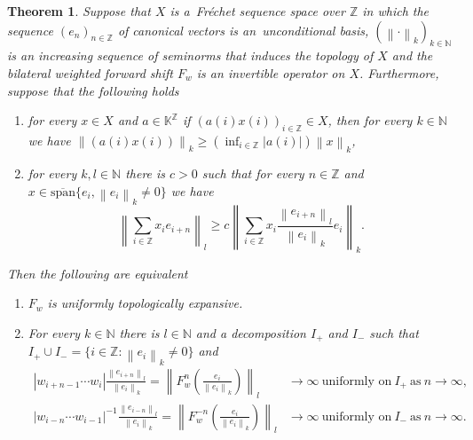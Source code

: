 \documentclass[11pt,a4paper]{amsart}
\newtheorem{theorem}{Theorem}[section]
\theoremstyle{definition}
\newcommand{\Z}{\mathbb{Z}}
\newcommand{\N}{\mathbb{N}}
\newcommand{\K}{\mathbb{K}}
\newcommand{\abs}[1]{\left| #1 \right|}
\newcommand{\norm}[1]{\left\| #1 \right\|}
\newcommand{\linsp}{\mathrm{span}}
\newcommand{\cllinsp}{\overline{\linsp}}
\begin{document}
	\begin{theorem}
		\label{thm:UTEcharacterisation}
		Suppose that \(X\) is a~Fréchet sequence space over \(\Z\) in which the sequence \((e_n)_{n \in \Z}\) of canonical vectors is an~unconditional basis, \((\norm{\cdot}_k)_{k \in \N}\) is an increasing sequence of seminorms that induces the topology of \(X\) and the bilateral weighted forward shift \(F_w\) is an invertible operator on \(X\). Furthermore, suppose that the following holds 
		\begin{enumerate}[label=(\arabic*)]
			\item for every $x \in X$ and \(a \in \K^\Z\) if \((a(i)x(i))_{i \in \Z} \in X\), then for every \(k \in \N\) we have \(\norm{(a(i)x(i))}_k \geq \left(\inf_{i \in \Z} |a(i)|\right) \norm{x}_k\),
			\item for every \(k, l \in \N\) there is \(c > 0\) such that for every \(n \in \Z\) and \(x \in \cllinsp\{e_i, \norm{e_i}_k \neq 0\}\) we have
			\[\norm{\sum_{i\in\Z}x_i e_{i+n}}_l \geq c  \norm{\sum_{i\in\Z} x_i \frac{\norm{e_{i+n}}_l}{\norm{e_i}_k} e_i}_k.\]
		\end{enumerate}
		Then the following are equivalent 
		\begin{enumerate}
			\item \(F_w\) is uniformly topologically expansive.
			\item For every \(k \in \N\) there is \(l \in \N\) and a decomposition \(I_{+}\) and \(I_{-}\) such that \(I_{+} \cup I_{-} = \{i \in \Z \colon \norm{e_i}_{k} \neq 0\}\) and 
			\begin{align*}
				\abs{w_{i+n-1} \cdots w_{i}}\frac{\norm{e_{i+n}}_l}{\norm{e_i}_k} = \norm{F_w^n\left(\frac{e_i}{\norm{e_i}_k}\right)}_l &\to \infty \ \text{uniformly on} \ I_+ \ \text{as} \ n \to \infty, \\
				\abs{w_{i-n} \cdots w_{i-1}}^{-1}\frac{\norm{e_{i-n}}_l}{\norm{e_i}_k} = \norm{F_w^{-n}\left(\frac{e_i}{\norm{e_i}_k}\right)}_l &\to \infty \ \text{uniformly on} \ I_- \ \text{as} \ n \to \infty.
			\end{align*}
		\end{enumerate}
	\end{theorem}
\end{document}
